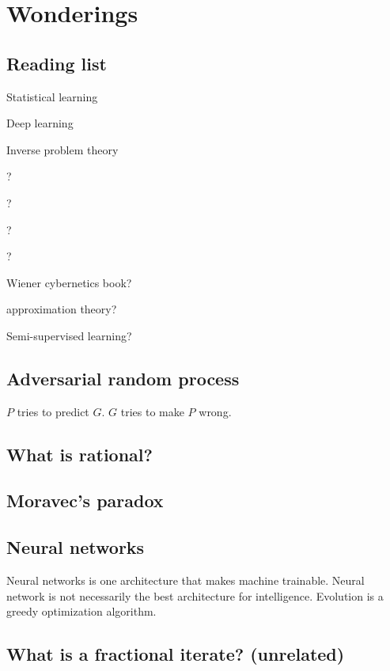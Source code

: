 \chapter{Wonderings}

\section{Reading list}

Statistical learning

Deep learning \cite{DeepLearning}

Inverse problem theory \cite{tarantola2005inverse}

? \cite{DeepArch}

? \cite{RepLearn}

? \cite{SuttonBartoRein}

? \cite{SepLogicAi}

Wiener cybernetics book? \cite{WienerCyber}

approximation theory? \cite{ApproxThePrac}

Semi-supervised learning?

\section{Adversarial random process}

\(P\) tries to predict \(G\).
\(G\) tries to make \(P\) wrong.

\section{What is rational?}

\section{Moravec's paradox}

\section{Neural networks}

Neural networks is one architecture that makes machine trainable.
Neural network is not necessarily the best architecture for intelligence.
Evolution is a greedy optimization algorithm.

\section{What is a fractional iterate? (unrelated)}

